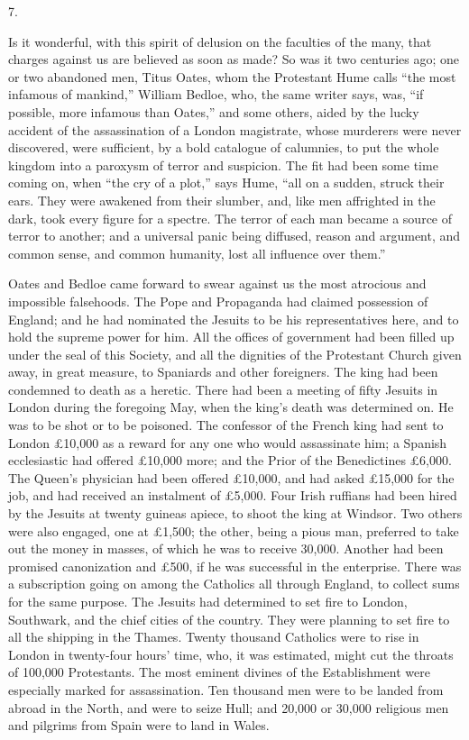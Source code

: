 7.

Is it wonderful, with this spirit of delusion on the
faculties of the many, that charges against us are believed as soon as made? So was it two centuries ago;
one or two abandoned men, Titus Oates, whom the
Protestant Hume calls ``the most infamous of
mankind,'' William Bedloe, who, the same writer says,
was, ``if possible, more infamous than Oates,''
and some others, aided by the lucky accident of the
assassination of a London magistrate, whose murderers
were never discovered, were sufficient, by a bold
catalogue of calumnies, to put the whole kingdom into a
paroxysm of terror and suspicion. The fit had been some
time coming on, when ``the cry of a plot,'' says
Hume, ``all on a sudden, struck their ears. They were
awakened from their slumber, and, like men affrighted in
the dark, took every figure for a spectre. The terror of
each man became a source of terror to another; and a
universal panic being diffused, reason and argument, and
common sense, and common humanity, lost all influence
over them.''

Oates and Bedloe came forward to swear against us the
most atrocious and impossible falsehoods. The Pope and
Propaganda had claimed possession of England; and he had
nominated the Jesuits to be his representatives here, and
to hold the supreme power for him. All the offices of
government had been filled up under the seal of this
Society, and all the dignities of the Protestant Church
given away, in great measure, to Spaniards and other
foreigners. The king had been condemned to death as a
heretic. There had been a meeting of fifty Jesuits in
London during the foregoing May, when the king's death
was determined on. He was to be shot or to be poisoned.
The confessor of the French king had sent to London £10,000 as a reward for any one who would assassinate
him; a Spanish ecclesiastic had offered £10,000 more;
and the Prior of the Benedictines £6,000. The Queen's
physician had been offered £10,000, and had asked
£15,000 for the job, and had received an instalment of
£5,000. Four Irish ruffians had been hired by the
Jesuits at twenty guineas apiece, to shoot the king at
Windsor. Two others were also engaged, one at £1,500;
the other, being a pious man, preferred to take out the
money in masses, of which he was to receive 30,000.
Another had been promised canonization and £500, if he
was successful in the enterprise. There was a
subscription going on among the Catholics all through
England, to collect sums for the same purpose. The
Jesuits had determined to set fire to London, Southwark,
and the chief cities of the country. They were planning
to set fire to all the shipping in the Thames. Twenty
thousand Catholics were to rise in London in twenty-four
hours' time, who, it was estimated, might cut the throats
of 100,000 Protestants. The most eminent divines of the
Establishment were especially marked for assassination.
Ten thousand men were to be landed from abroad in the
North, and were to seize Hull; and 20,000 or 30,000
religious men and pilgrims from Spain were to land in
Wales.

